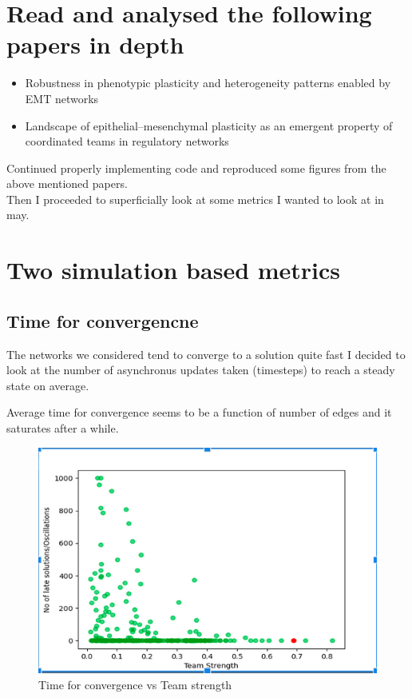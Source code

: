 \documentclass{report}
\begin{document}
\section{Read and analysed the following papers in depth}
 \begin{itemize}
 
 \item Robustness in phenotypic plasticity and heterogeneity patterns enabled by EMT networks

 \item Landscape of epithelial–mesenchymal plasticity as an emergent property of coordinated teams in regulatory networks

 
 \end{itemize}
Continued properly implementing code and reproduced some figures from the above mentioned papers.
\\
Then I proceeded to superficially look at some metrics I wanted to look at in may. 

\section{Two simulation based metrics}

\subsection{Time for convergencne }
The networks we considered tend to converge to a solution quite fast
I decided to look at the number of asynchronus updates taken (timesteps) to reach a steady state on average. 

Average time for convergence seems to be a function of number of edges and it saturates after a while. 
\begin{figure}[H]\centering 
	\includegraphics[scale=0.4]{img/time_for_covg_vs_teamstrength.png}
	\caption{Time for convergence vs Team strength}


\end{figure}
\end{document}
